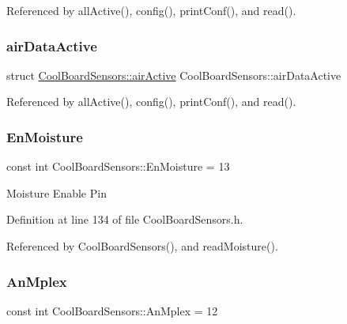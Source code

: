 Referenced by all\+Active(), config(), print\+Conf(), and read().

\mbox{\label{class_cool_board_sensors_abff8dfeccb2f7689847bb64d5f1cd31e}} 
\subsubsection{\texorpdfstring{air\+Data\+Active}{airDataActive}}
{\footnotesize\ttfamily struct \hyperlink{class_cool_board_sensors_d7/db6/struct_cool_board_sensors_1_1air_active}{Cool\+Board\+Sensors\+::air\+Active} Cool\+Board\+Sensors\+::air\+Data\+Active\hspace{0.3cm}{\ttfamily [private]}}



Referenced by all\+Active(), config(), print\+Conf(), and read().

\mbox{\label{class_cool_board_sensors_a6177d02e14a057a2f171a2e930b5038d}} 
\subsubsection{\texorpdfstring{En\+Moisture}{EnMoisture}}
{\footnotesize\ttfamily const int Cool\+Board\+Sensors\+::\+En\+Moisture = 13\hspace{0.3cm}{\ttfamily [private]}}

Moisture Enable Pin 

Definition at line 134 of file Cool\+Board\+Sensors.\+h.



Referenced by Cool\+Board\+Sensors(), and read\+Moisture().

\mbox{\label{class_cool_board_sensors_a12ef28b1046219e0aee10bf64e28c4a5}} 
\subsubsection{\texorpdfstring{An\+Mplex}{AnMplex}}
{\footnotesize\ttfamily const int Cool\+Board\+Sensors\+::\+An\+Mplex = 12\hspace{0.3cm}{\ttfamily [private]}}

